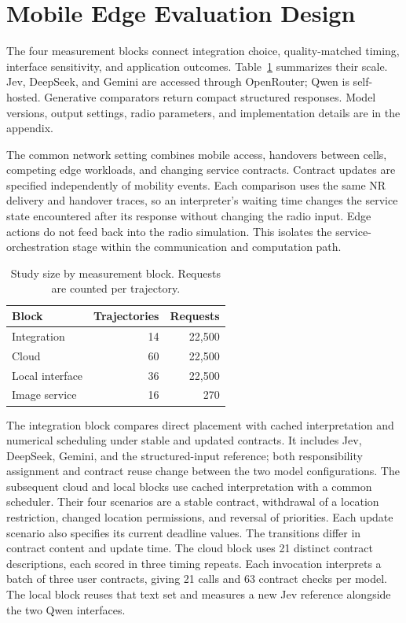 \section{Mobile Edge Evaluation Design}
\label{sec:study}
The four measurement blocks connect integration choice, quality-matched timing, interface sensitivity, and application outcomes. Table~\ref{tab:design} summarizes their scale. Jev, DeepSeek, and Gemini are accessed through OpenRouter; Qwen is self-hosted. Generative comparators return compact structured responses. Model versions, output settings, radio parameters, and implementation details are in the appendix.

The common network setting combines mobile access, handovers between cells, competing edge workloads, and changing service contracts. Contract updates are specified independently of mobility events. Each comparison uses the same NR delivery and handover traces, so an interpreter's waiting time changes the service state encountered after its response without changing the radio input. Edge actions do not feed back into the radio simulation. This isolates the service-orchestration stage within the communication and computation path.

\begin{table}[t]
\centering
\caption{Study size by measurement block. Requests are counted per trajectory.}
\label{tab:design}
\footnotesize\setlength{\tabcolsep}{6pt}\renewcommand{\arraystretch}{1.15}
\begin{tabular}{@{}lrr@{}}\toprule
\rowcolor{TableHeaderShade}
Block & Trajectories & Requests\\\midrule
Integration & 14 & 22,500\\
Cloud & 60 & 22,500\\
Local interface & 36 & 22,500\\
Image service & 16 & 270\\\bottomrule
\end{tabular}
\end{table}

The integration block compares direct placement with cached interpretation and numerical scheduling under stable and updated contracts. It includes Jev, DeepSeek, Gemini, and the structured-input reference; both responsibility assignment and contract reuse change between the two model configurations. The subsequent cloud and local blocks use cached interpretation with a common scheduler. Their four scenarios are a stable contract, withdrawal of a location restriction, changed location permissions, and reversal of priorities. Each update scenario also specifies its current deadline values. The transitions differ in contract content and update time. The cloud block uses 21 distinct contract descriptions, each scored in three timing repeats. Each invocation interprets a batch of three user contracts, giving 21 calls and 63 contract checks per model. The local block reuses that text set and measures a new Jev reference alongside the two Qwen interfaces.

